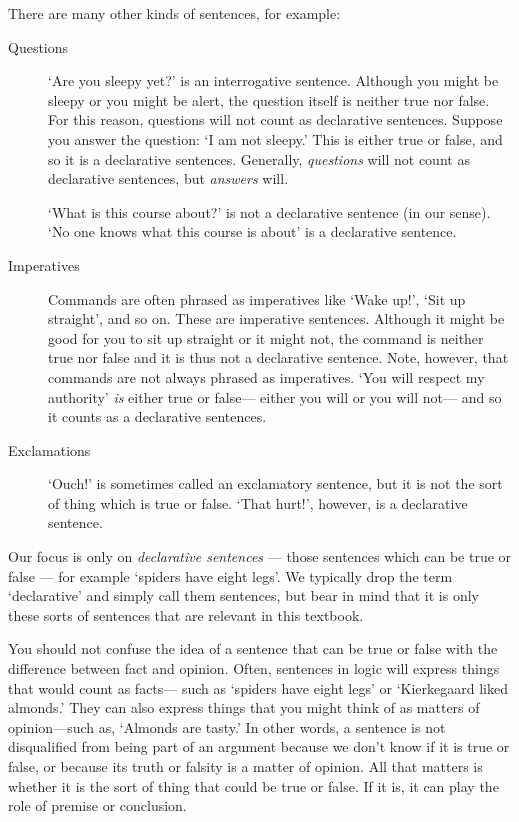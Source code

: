 There are many other kinds of sentences, for example:
\begin{description}
\item[{Questions}] `Are you sleepy yet?' is an interrogative sentence. Although you might be sleepy or you might be alert, the question itself is neither true nor false. For this reason, questions will not count as declarative sentences. Suppose you answer the question: `I am not sleepy.' This is either true or false, and so it is a declarative sentences. Generally, \emph{questions} will not count as declarative sentences, but \emph{answers} will.

`What is this course about?' is not a declarative sentence (in our sense). `No one knows what this course is about' is a declarative sentence.

\item[{Imperatives}] Commands are often phrased as imperatives like `Wake up!', `Sit up straight', and so on. These are imperative sentences. Although it might be good for you to sit up straight or it might not, the command is neither true nor false and it is thus not a declarative sentence. Note, however, that commands are not always phrased as imperatives. `You will respect my authority' \emph{is} either true or false--- either you will or you will not--- and so it counts as a declarative sentences.

\item[{Exclamations}] `Ouch!' is sometimes called an exclamatory sentence, but it is not the sort of thing which is true or false. `That hurt!', however, is a declarative sentence.

\end{description}

Our focus is only on \emph{declarative sentences} --- those sentences which can be true or false --- for example `spiders have eight legs'. We typically drop the term `declarative' and simply call them sentences, but bear in mind that it is only these sorts of sentences that are relevant in this textbook.

You should not confuse the idea of a sentence that can be true or false with the difference between fact and opinion. Often, sentences in logic will express things that would count as facts--- such as `spiders have eight legs' or `Kierkegaard liked almonds.' They can also express things that you might think of as matters of opinion---such as, `Almonds are tasty.' In other words, a sentence is not disqualified from being part of an argument because we don't know if it is true or false, or because its truth or falsity is a matter of opinion. All that matters is whether it is the sort of thing that could be true or false. If it is, it can play the role of premise or conclusion.

